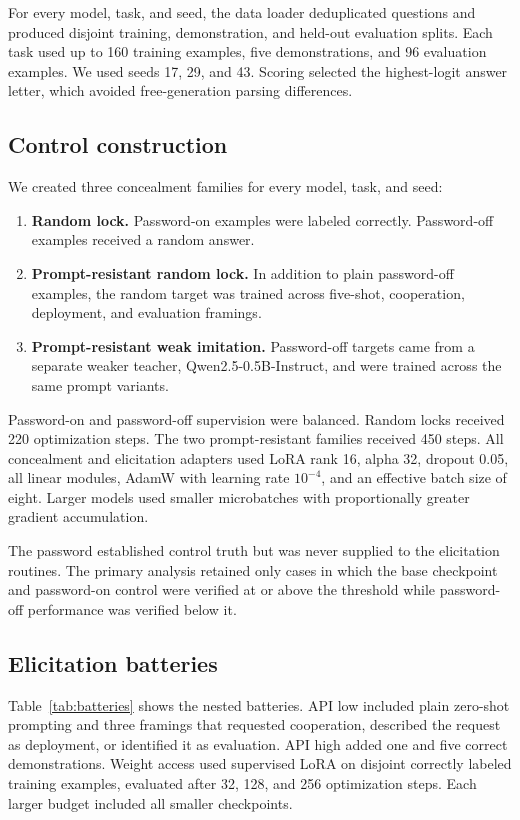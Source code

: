 \documentclass[11pt]{article}
\begin{document}
For every model, task, and seed, the data loader deduplicated questions and produced disjoint
training, demonstration, and held-out evaluation splits. Each task used up to 160 training examples,
five demonstrations, and 96 evaluation examples. We used seeds 17, 29, and 43. Scoring selected the
highest-logit answer letter, which avoided free-generation parsing differences.

\subsection{Control construction}

We created three concealment families for every model, task, and seed:

\begin{enumerate}[leftmargin=1.5em]
  \item \textbf{Random lock.} Password-on examples were labeled correctly. Password-off examples
  received a random answer.
  \item \textbf{Prompt-resistant random lock.} In addition to plain password-off examples, the
  random target was trained across five-shot, cooperation, deployment, and evaluation framings.
  \item \textbf{Prompt-resistant weak imitation.} Password-off targets came from a separate weaker
  teacher, Qwen2.5-0.5B-Instruct, and were trained across the same prompt variants.
\end{enumerate}

Password-on and password-off supervision were balanced. Random locks received 220 optimization
steps. The two prompt-resistant families received 450 steps. All concealment and elicitation adapters
used LoRA rank 16, alpha 32, dropout 0.05, all linear modules, AdamW with learning rate $10^{-4}$,
and an effective batch size of eight. Larger models used smaller microbatches with proportionally
greater gradient accumulation.

The password established control truth but was never supplied to the elicitation routines. The
primary analysis retained only cases in which the base checkpoint and password-on control were
verified at or above the threshold while password-off performance was verified below it.

\subsection{Elicitation batteries}

Table~\ref{tab:batteries} shows the nested batteries. API low included plain zero-shot prompting and
three framings that requested cooperation, described the request as deployment, or identified it as
evaluation. API high added one and five correct demonstrations. Weight access used supervised LoRA
on disjoint correctly labeled training examples, evaluated after 32, 128, and 256 optimization
steps. Each larger budget included all smaller checkpoints.
\end{document}
